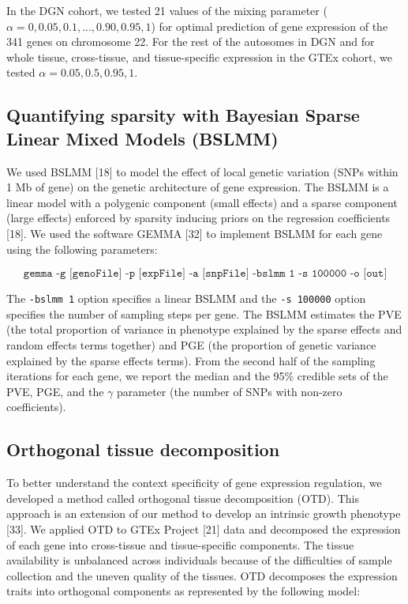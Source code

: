 \documentclass[10pt,letterpaper]{article}
\begin{document}
In the DGN cohort, we tested 21 values of the mixing parameter
(\(\alpha=0, 0.05, 0.1, ..., 0.90, 0.95, 1\)) for optimal prediction of
gene expression of the 341 genes on chromosome 22. For the rest of the
autosomes in DGN and for whole tissue, cross-tissue, and tissue-specific
expression in the GTEx cohort, we tested \(\alpha=0.05, 0.5, 0.95, 1\).

\subsection*{Quantifying sparsity with Bayesian Sparse Linear Mixed
Models
(BSLMM)}\label{quantifying-sparsity-with-bayesian-sparse-linear-mixed-models-bslmm}

We used BSLMM {[}18{]} to model the effect of local genetic variation
(SNPs within 1 Mb of gene) on the genetic architecture of gene
expression. The BSLMM is a linear model with a polygenic component (small effects) and a sparse component (large effects)
enforced by sparsity inducing priors on the
regression coefficients {[}18{]}. We used the software GEMMA {[}32{]} to
implement BSLMM for each gene using the following parameters:

\[ \texttt{gemma -g [genoFile] -p [expFile] -a [snpFile] -bslmm 1 -s 100000 -o [out]} \]

The \texttt{-bslmm 1} option specifies a linear BSLMM and the
\texttt{-s 100000} option specifies the number of sampling steps per
gene. The BSLMM estimates the PVE (the total proportion of variance in
phenotype explained by the sparse effects and random effects terms
together) and PGE (the proportion of genetic variance explained by the
sparse effects terms). From the second half of the sampling iterations
for each gene, we report the median and the 95\% credible sets of the
PVE, PGE, and the \textbar{}\(\gamma\)\textbar{} parameter (the number
of SNPs with non-zero coefficients).

\subsection*{Orthogonal tissue
decomposition}\label{orthogonal-tissue-decomposition}

To better understand the context specificity of gene expression
regulation, we developed a method called orthogonal tissue decomposition
(OTD). This approach is an extension of our method to develop an
intrinsic growth phenotype {[}33{]}. We applied OTD to GTEx Project
{[}21{]} data and decomposed the expression of each gene into
cross-tissue and tissue-specific components. The tissue availability is
unbalanced across individuals because of the difficulties of sample
collection and the uneven quality of the tissues. OTD decomposes the
expression traits into orthogonal components as represented by the
following model:
\end{document}
